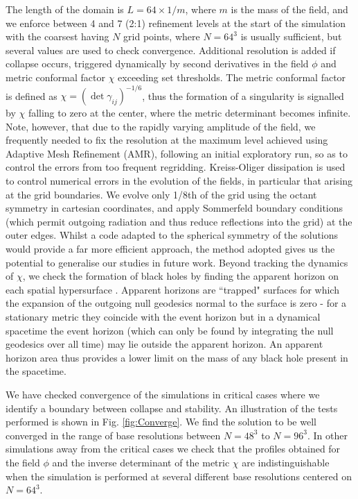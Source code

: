 \documentclass[11pt,a4paper]{article}
\begin{document}
The length of the domain is $L = 64 \times 1/m$, where $m$ is the mass of the field, and we enforce between 4 and 7 (2:1) refinement levels at the start of the simulation with the coarsest having $N$ grid points, where $N=64^3$ is usually sufficient, but several values are used to check convergence. Additional resolution is added if collapse occurs, triggered dynamically by second derivatives in the field $\phi$ and metric conformal factor $\chi$ exceeding set thresholds. The metric conformal factor is defined as $\chi = \left(\det \gamma_{ij}\right)^{-1/6}$, thus the formation of a singularity is signalled by $\chi$ falling to zero at the center, where the metric determinant becomes infinite. Note, however, that due to the rapidly varying amplitude of the field, we frequently needed to fix the resolution at the maximum level achieved using Adaptive Mesh Refinement (AMR), following an initial exploratory run, so as to control the errors from too frequent regridding.
Kreiss-Oliger dissipation is used to control numerical errors in the evolution of the fields, in particular that arising at the grid boundaries. We evolve only 1/8th of the grid using the octant symmetry in cartesian coordinates, and apply Sommerfeld boundary conditions (which permit outgoing radiation and thus reduce reflections into the grid) at the outer edges. Whilst a code adapted to the spherical symmetry of the solutions would provide a far more efficient approach, the method adopted gives us the potential to generalise our studies in future work. Beyond tracking the dynamics of $\chi$, we check the formation of black holes by finding the apparent horizon on each spatial hypersurface \cite{Thornburg:2006zb}. Apparent horizons are ``trapped" surfaces for which the expansion of the outgoing null geodesics normal to the surface is zero - for a stationary metric they coincide with the event horizon but in a dynamical spacetime the event horizon (which can only be found by integrating the null geodesics over all time) may lie outside the apparent horizon. An apparent horizon area thus provides a lower limit on the mass of any black hole present in the spacetime.

We have checked convergence of the simulations in critical cases where we identify a boundary between collapse and stability. An illustration of the tests performed is shown in Fig. \ref{fig:Converge}. We find the solution to be well converged in the range of base resolutions between $N = 48^3$ to $N = 96^3$. In other simulations away from the critical cases we check that the profiles obtained for the field $\phi$ and the inverse determinant of the metric $\chi$ are indistinguishable when the simulation is performed at several different base resolutions centered on $N = 64^3$.
\end{document}
